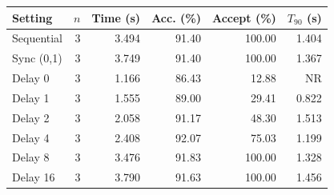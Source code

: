 \begin{tabular}{lrrrrr}\toprule
Setting & $n$ & Time (s) & Acc. (\%) & Accept (\%) & $T_{90}$ (s)\\\midrule
Sequential & 3 & 3.494 & 91.40 & 100.00 & 1.404 \\
Sync (0,1) & 3 & 3.749 & 91.40 & 100.00 & 1.367 \\
Delay 0 & 3 & 1.166 & 86.43 & 12.88 & NR \\
Delay 1 & 3 & 1.555 & 89.00 & 29.41 & 0.822 \\
Delay 2 & 3 & 2.058 & 91.17 & 48.30 & 1.513 \\
Delay 4 & 3 & 2.408 & 92.07 & 75.03 & 1.199 \\
Delay 8 & 3 & 3.476 & 91.83 & 100.00 & 1.328 \\
Delay 16 & 3 & 3.790 & 91.63 & 100.00 & 1.456 \\
\bottomrule\end{tabular}
